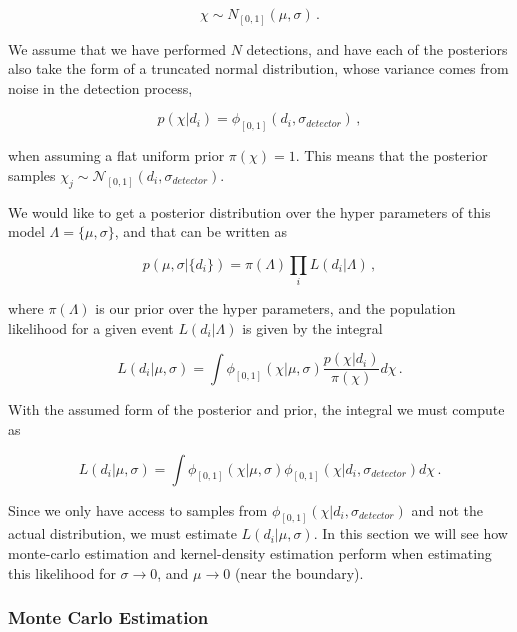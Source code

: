 \documentclass[twocolumn,usenames,dvipsnames,linenumbers]{aastex631}
\begin{document}
\begin{equation}
	\label{spins_are_truncated_normal}
	\chi \sim N_{[0,1]}(\mu, \sigma)\, .
\end{equation}

We assume that we have performed $N$ detections, and have each of the posteriors also take the form of a truncated normal distribution, whose variance comes from noise in the detection process,

\begin{equation}
	p(\chi | d_i) = \phi_{[0,1]}(d_i, \sigma_{detector})\, ,
\end{equation}

when assuming a flat uniform prior $\pi(\chi) = 1$. This means that the posterior samples $\chi_j \sim \mathcal{N}_{[0,1]}(d_i, \sigma_{detector})$.

We would like to get a posterior distribution over the hyper parameters of this model $\Lambda = \{\mu, \sigma\}$, and that can be written as

\begin{equation}
	p(\mu, \sigma | \{d_i\}) = \pi(\Lambda) \prod_{i} L(d_i | \Lambda) \, ,
\end{equation}

where $ \pi(\Lambda)$ is our prior over the hyper parameters, and the population likelihood for a given event $L(d_i | \Lambda)$ is given by the integral

\begin{equation}
	L(d_i | \mu, \sigma) = \int \phi_{[0,1]}(\chi | \mu, \sigma) \frac{p(\chi | d_i)}{\pi(\chi)} d\chi \, .
\end{equation}

With the assumed form of the posterior and prior, the integral we must compute as

\begin{equation}
	L(d_i | \mu, \sigma) = \int \phi_{[0,1]}(\chi | \mu, \sigma) \phi_{[0,1]}(\chi | d_i, \sigma_{detector}) d\chi \, .
\end{equation}

Since we only have access to samples from $\phi_{[0,1]}(\chi | d_i, \sigma_{detector})$ and not the actual distribution, we must estimate $L(d_i | \mu, \sigma)$. In this section we will see how monte-carlo estimation and kernel-density estimation perform when estimating this likelihood for $\sigma \to 0$, and $\mu \to 0$ (near the boundary).


\subsubsection{Monte Carlo Estimation}
\end{document}
